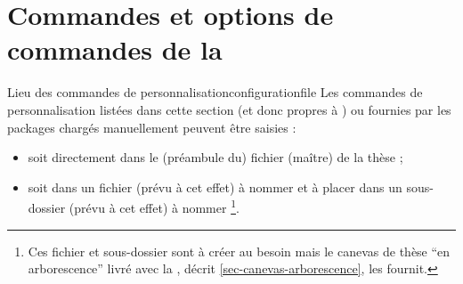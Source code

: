 %
%
%
%

\section{Commandes et options de commandes de la \yatCl}
%
%

\begin{dbremark}{Lieu des commandes de personnalisation}{configurationfile}
  Les commandes de personnalisation listées dans cette section (et donc propres
  à \yatCl{}) ou fournies par les packages chargés manuellement peuvent être
  saisies :
  \begin{itemize}
  \item soit directement dans le (préambule du) fichier (maître) de la thèse ;
  \item%
    soit dans un fichier (prévu à cet effet) à nommer \file{\configurationfile}
    et à placer dans un sous-dossier (prévu à cet effet) à nommer
    \folder{\configurationdirectory}\footnote{Ces fichier et sous-dossier sont
      à créer au besoin mais le canevas de thèse \enquote{en arborescence} livré
      avec la \yatCl, décrit \vref{sec-canevas-arborescence}, les fournit.}.
  \end{itemize}
\end{dbremark}

